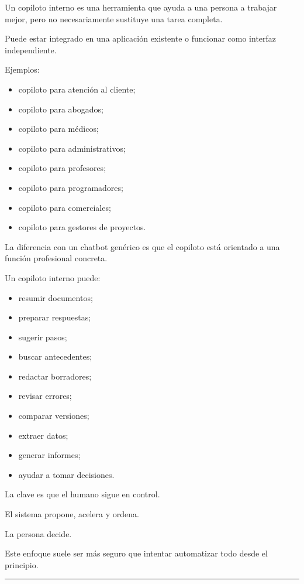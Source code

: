 Un copiloto interno es una herramienta que ayuda a una persona a
trabajar mejor, pero no necesariamente sustituye una tarea completa.

Puede estar integrado en una aplicación existente o funcionar como
interfaz independiente.

Ejemplos:

\begin{itemize}
\tightlist
\item
  copiloto para atención al cliente;
\item
  copiloto para abogados;
\item
  copiloto para médicos;
\item
  copiloto para administrativos;
\item
  copiloto para profesores;
\item
  copiloto para programadores;
\item
  copiloto para comerciales;
\item
  copiloto para gestores de proyectos.
\end{itemize}

La diferencia con un chatbot genérico es que el copiloto está orientado
a una función profesional concreta.

Un copiloto interno puede:

\begin{itemize}
\tightlist
\item
  resumir documentos;
\item
  preparar respuestas;
\item
  sugerir pasos;
\item
  buscar antecedentes;
\item
  redactar borradores;
\item
  revisar errores;
\item
  comparar versiones;
\item
  extraer datos;
\item
  generar informes;
\item
  ayudar a tomar decisiones.
\end{itemize}

La clave es que el humano sigue en control.

El sistema propone, acelera y ordena.

La persona decide.

Este enfoque suele ser más seguro que intentar automatizar todo desde el
principio.

\begin{center}\rule{0.5\linewidth}{0.5pt}\end{center}

